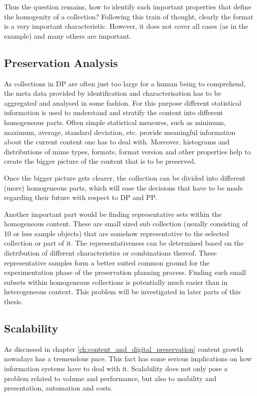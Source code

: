 Thus the question remains, how to identify such important properties that define the homogenity of a collection? Following this train of thought, clearly the format is a very important characteristic. However, it does not cover all cases (as in the example) and many others are important.
\subsection{Preservation Analysis}
As collections in DP are often just too large for a human being to comprehend, the meta data provided by identification and characterisation has to be aggregated and analysed in some fashion. For this purpose different statistical information is used to understand and stratify  the content into different homogeneous parts. Often simple statistical measures, such as minimum, maximum, average, standard deviation, etc. provide meaningful information about the current content one has to deal with. Moreover, histograms and distributions of mime types, formats, format version and other properties help to create the bigger picture of the content that is to be preserved.

Once the bigger picture gets clearer, the collection can be divided into different (more) homogeneous parts, which will ease the decisions that have to be made regarding their future with respect to DP and PP.

Another important part would be finding representative sets within the homogeneous content. These are small sized sub collection (usually consisting of 10 or less sample objects) that are somehow representative to the selected collection or part of it. The representativeness can be determined based on the distribution of different characteristics or combinations thereof. These representative samples form a better suited common ground for the experimentation phase of the preservation planning process. Finding such small subsets within homogeneous collections is potentially much easier than in heterogeneous context. This problem will be investigated in later parts of this thesis.

\subsection{Scalability}
As discussed in chapter \ref{ch:content_and_digital_preservation} content growth nowadays has a tremendous pace. This fact has some serious implications on how information systems have to deal with it. Scalability does not only pose a problem related to volume and performance, but also to usability and presentation, automation and costs.

